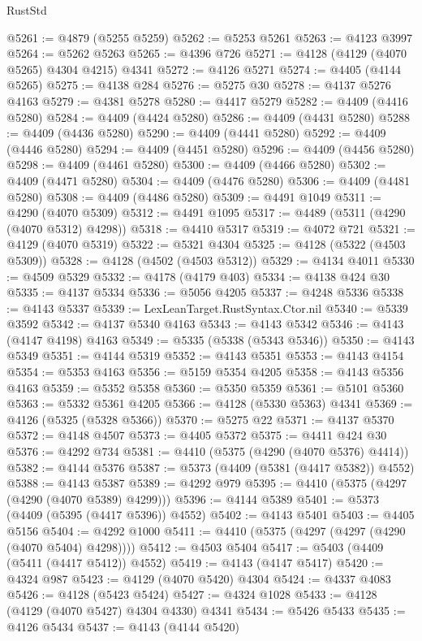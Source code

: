 \begin{lexlean}{RustStd}
\begin{coremodule}
@5261 := @4879 (@5255 @5259)
@5262 := @5253 @5261
@5263 := @4123 @3997
@5264 := @5262 @5263
@5265 := @4396 @726
@5271 := @4128 (@4129 (@4070 @5265) @4304 @4215) @4341
@5272 := @4126 @5271
@5274 := @4405 (@4144 @5265)
@5275 := @4138 @284
@5276 := @5275 @30
@5278 := @4137 @5276 @4163
@5279 := @4381 @5278
@5280 := @4417 @5279
@5282 := @4409 (@4416 @5280)
@5284 := @4409 (@4424 @5280)
@5286 := @4409 (@4431 @5280)
@5288 := @4409 (@4436 @5280)
@5290 := @4409 (@4441 @5280)
@5292 := @4409 (@4446 @5280)
@5294 := @4409 (@4451 @5280)
@5296 := @4409 (@4456 @5280)
@5298 := @4409 (@4461 @5280)
@5300 := @4409 (@4466 @5280)
@5302 := @4409 (@4471 @5280)
@5304 := @4409 (@4476 @5280)
@5306 := @4409 (@4481 @5280)
@5308 := @4409 (@4486 @5280)
@5309 := @4491 @1049
@5311 := @4290 (@4070 @5309)
@5312 := @4491 @1095
@5317 := @4489 (@5311 (@4290 (@4070 @5312) @4298))
@5318 := @4410 @5317
@5319 := @4072 @721
@5321 := @4129 (@4070 @5319)
@5322 := @5321 @4304
@5325 := @4128 (@5322 (@4503 @5309))
@5328 := @4128 (@4502 (@4503 @5312))
@5329 := @4134 @4011
@5330 := @4509 @5329
@5332 := @4178 (@4179 @403)
@5334 := @4138 @424 @30
@5335 := @4137 @5334
@5336 := @5056 @4205
@5337 := @4248 @5336
@5338 := @4143 @5337
@5339 := LexLeanTarget.RustSyntax.Ctor.nil
@5340 := @5339 @3592
@5342 := @4137 @5340 @4163
@5343 := @4143 @5342
@5346 := @4143 (@4147 @4198) @4163
@5349 := @5335 (@5338 (@5343 @5346))
@5350 := @4143 @5349
@5351 := @4144 @5319
@5352 := @4143 @5351
@5353 := @4143 @4154
@5354 := @5353 @4163
@5356 := @5159 @5354 @4205
@5358 := @4143 @5356 @4163
@5359 := @5352 @5358
@5360 := @5350 @5359
@5361 := @5101 @5360
@5363 := @5332 @5361 @4205
@5366 := @4128 (@5330 @5363) @4341
@5369 := @4126 (@5325 (@5328 @5366))
@5370 := @5275 @22
@5371 := @4137 @5370
@5372 := @4148 @4507
@5373 := @4405 @5372
@5375 := @4411 @424 @30
@5376 := @4292 @734
@5381 := @4410 (@5375 (@4290 (@4070 @5376) @4414))
@5382 := @4144 @5376
@5387 := @5373 (@4409 (@5381 (@4417 @5382)) @4552)
@5388 := @4143 @5387
@5389 := @4292 @979
@5395 := @4410 (@5375 (@4297 (@4290 (@4070 @5389) @4299)))
@5396 := @4144 @5389
@5401 := @5373 (@4409 (@5395 (@4417 @5396)) @4552)
@5402 := @4143 @5401
@5403 := @4405 @5156
@5404 := @4292 @1000
@5411 := @4410 (@5375 (@4297 (@4297 (@4290 (@4070 @5404) @4298))))
@5412 := @4503 @5404
@5417 := @5403 (@4409 (@5411 (@4417 @5412)) @4552)
@5419 := @4143 (@4147 @5417)
@5420 := @4324 @987
@5423 := @4129 (@4070 @5420) @4304
@5424 := @4337 @4083
@5426 := @4128 (@5423 @5424)
@5427 := @4324 @1028
@5433 := @4128 (@4129 (@4070 @5427) @4304 @4330) @4341
@5434 := @5426 @5433
@5435 := @4126 @5434
@5437 := @4143 (@4144 @5420)

\end{coremodule}
\end{lexlean}
